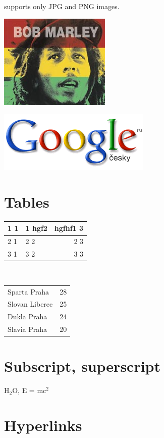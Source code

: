 \documentclass[a4paper,11pt]{article} \usepackage{ulem}
\newcommand{\MYp}[1]{ {\color[rgb]{0.392,0.392,0.392}#1} }
\begin{document}
\MYp{
  supports only JPG and PNG images.}

\MYp{
  \begin{center}

    \includegraphics{marley.jpg}
  \end{center}}

\MYp{
  \includegraphics{logo.png}}

\section{Tables}
\begin{tabular}{|l|p{5cm}|r|}
  \hline 
  1 1 & 1 hgf2 & hgfhf1 3 \\ 
  \hline
  2 1 & 2 2 & 2 3 \\ 
  \hline
  3 1 & 3 2 & 3 3 \\ 
  \hline

\end{tabular}
\\
\begin{tabular}{p{10cm}|p{3cm}}
  Sparta Praha & 28 \\ 
  Slovan Liberec & 25 \\ 
  Dukla Praha & 24 \\ 
  Slavia Praha & 20
\end{tabular}

\section{Subscript, superscript}

\MYp{H$_2$O, E = mc$^2$}

\section{Hyperlinks}
\end{document}
